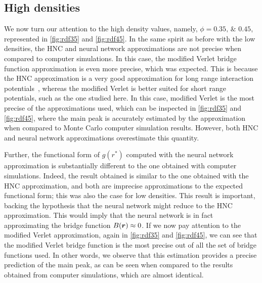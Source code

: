 \subsection{High densities}
We now turn our attention to the high density values, namely,
$\phi=\numlist[list-pair-separator={\enspace\text{and}\enspace}]{0.35; 0.45}$,
represented in \autoref{fig:rdf35} and \ref{fig:rdf45}.
In the same spirit as before with the low densities, the HNC and neural network 
approximations are not precise when compared to computer simulations. In this case,
the modified Verlet bridge function approximation is even more precise, which was expected.
This is because the HNC approximation is a very good approximation for long range
interaction potentials~\cite{hansenTheorySimpleLiquids2013}, whereas the modified Verlet is 
better suited for short range potentials, such as the one studied here.
In this case, modified Verlet is the most precise of the approximations used, which
can be inspected in \autoref{fig:rdf35} and \autoref{fig:rdf45}, where the 
main peak is accurately estimated by the approximation when compared to Monte Carlo 
computer simulation results. However, both HNC and neural network approximations 
overestimate this quantity.

Further, the functional form of $g(r^*)$ computed with the neural network approximation 
is substantially different to the one obtained with computer simulations. Indeed, the result
obtained is similar to the one obtained with the HNC approximation, and both are imprecise 
approximations to the expected functional form; this was also the case for low densities.
This result is important, backing the hypothesis that the
neural network might reduce to the HNC approximation.
This would imply that the neural network is in fact approximating the bridge function
$B(\bm{r}) \approx 0$. If we now pay attention to the modified Verlet
approximation, again in \autoref{fig:rdf35} and \autoref{fig:rdf45}, 
we can see that the modified Verlet bridge function is the most precise
out of all the set of bridge functions used. In other words, we observe that this
estimation provides a precise prediction of the main peak, as can be seen when compared to 
the results obtained from computer simulations, which are almost identical.

